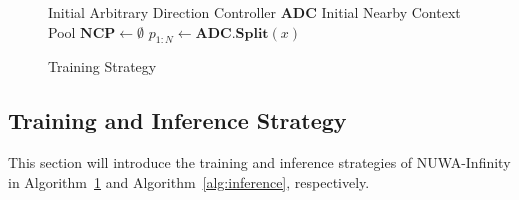 \documentclass{article}
\begin{document}


\begin{figure}
\vspace{-0.17in}
\begin{minipage}{1\linewidth}
\begin{algorithm}[H]\label{alg:training}
\SetAlgoNoLine
\caption{Training Strategy}

Initial Arbitrary Direction Controller \textbf{ADC}\;
Initial Nearby Context Pool $ \textbf{NCP} \leftarrow \emptyset $ \;
$p_{1:N} \leftarrow \textbf{ADC.Split}(x)$\;
\end{algorithm}
\end{minipage}
\end{figure}

\subsection{Training and Inference Strategy}\label{sec:train}
This section will introduce the training and inference strategies of NUWA-Infinity in Algorithm~\ref{alg:training} and Algorithm~\ref{alg:inference}, respectively.
\end{document}
